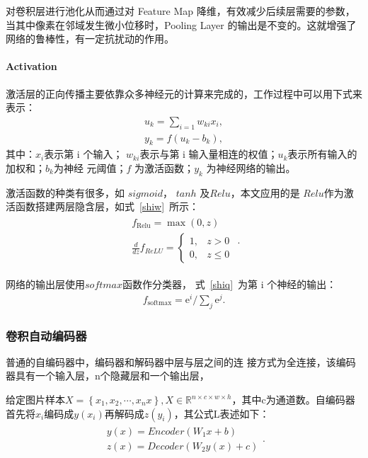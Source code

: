 \documentclass{whutmod}
\begin{document}
	对卷积层进行池化从而通过对 Feature Map 降维，有效减少后续层需要的参数，当其中像素在邻域发生微小位移时，Pooling Layer 的输出是不变的。这就增强了网络的鲁棒性，有一定抗扰动的作用。
	
	\paragraph{Activation} 激活层的正向传播主要依靠众多神经元的计算来完成的，工作过程中可以用下式来表示：
	\begin{gather*}
	{u_{k}=\sum_{i=1} w_{k i} x_{i}}, \\ {y_{k}=f\left(u_{k}-b_{k}\right)},
	\end{gather*}
	其中：$x_{i}$表示第 i 个输入； $w_{ki}$表示与第 i 输入量相连的权值；$u_{k}$表示所有输入的加权和；$b_{k}$为神经 元阈值；$ f$ 为激活函数；$y_{k}$ 为神经网络的输出。
	
	激活函数的种类有很多，如 $sigmoid$， $tanh$ 及$ Relu$，本文应用的是 $Relu$作为激活函数搭建两层隐含层，如式~\ref{shiw}~所示：
	\begin{gather}\label{shiw}
	\begin{array}{c}{f_{\text {Relu}}=\max (0, z)}\\
	\frac{d}{d z} f_{R e L U}=\left\{\begin{array}{ll}{1,} & {z>0} \\ {0,} & {z \leqslant 0}\end{array}\right.
	\end{array}.
	\end{gather}
	
	网络的输出层使用$ softmax $函数作分类器， 式~\ref{shiq}~为第 i 个神经的输出：
	\begin{gather*}\label{shiq}
	f_{\text {softmax}}=\mathrm{e}^{i} / \sum_{j} \mathrm{e}^{j}.
	\end{gather*}
	
			\subsubsection{卷积自动编码器}
			普通的自编码器中，编码器和解码器中层与层之间的连
			接方式为全连接，该编码器具有一个输入层，n个隐藏层和一个输出层，
			
			给定图片样本$X=\left\{ x_1,x_2,\cdots,x_nx \right\}, X\in \mathbb{R}^{n\times c\times w \times h}$，其中c为通道数。自编码器首先将$x_i$编码成$y(x_i)$再解码成$z(y_i)$，其公式L表述如下：
				\begin{gather}
			\begin{array}{l}
			y(x)=Encoder\left(W_{1} x+b\right) \\
			z(x)=Decoder\left(W_{2} y(x)+c\right)
			\end{array}.
			\end{gather}
			
\end{document}
